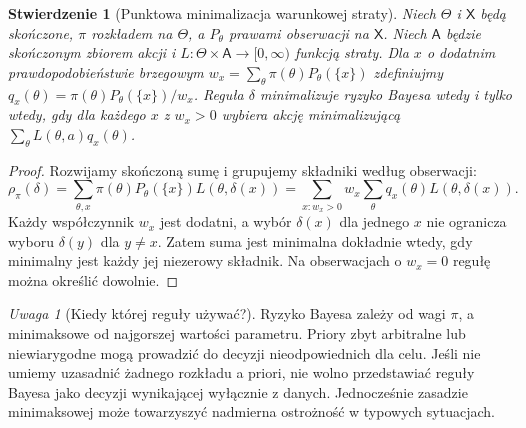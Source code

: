 \documentclass[11pt,a4paper,oneside]{report}
\numberwithin{equation}{chapter}
\theoremstyle{plain}
\newtheorem{stwierdzenie}[twierdzenie]{Stwierdzenie}
\theoremstyle{definition}
\theoremstyle{remark}
\newtheorem{uwaga}{Uwaga}[chapter]
\begin{document}
\begin{stwierdzenie}[Punktowa minimalizacja warunkowej straty]
\label{prop:conditional-decision}
Niech $\Theta$ i $\mathsf X$ będą skończone, $\pi$ rozkładem na
$\Theta$, a $P_\theta$ prawami obserwacji na $\mathsf X$.
Niech $\mathsf A$ będzie skończonym zbiorem akcji i
$L:\Theta\times\mathsf A\to[0,\infty)$ funkcją straty.
Dla $x$ o dodatnim prawdopodobieństwie brzegowym
$w_x=\sum_{\theta}\pi(\theta)P_\theta(\{x\})$ zdefiniujmy
$q_x(\theta)=\pi(\theta)P_\theta(\{x\})/w_x$.
Reguła $\delta$ minimalizuje ryzyko Bayesa wtedy i tylko wtedy,
gdy dla każdego $x$ z $w_x>0$ wybiera akcję minimalizującą
$\sum_{\theta}L(\theta,a)q_x(\theta)$.
\end{stwierdzenie}
\begin{proof}
Rozwijamy skończoną sumę i grupujemy składniki według obserwacji:
\[
\rho_\pi(\delta)
=\sum_{\theta,x}\pi(\theta)P_\theta(\{x\})L(\theta,\delta(x))
=\sum_{x:w_x>0}w_x\sum_{\theta}q_x(\theta)L(\theta,\delta(x)).
\]
Każdy współczynnik $w_x$ jest dodatni, a wybór $\delta(x)$ dla
jednego $x$ nie ogranicza wyboru $\delta(y)$ dla $y\ne x$.
Zatem suma jest minimalna dokładnie wtedy, gdy minimalny jest każdy
jej niezerowy składnik. Na obserwacjach o $w_x=0$ regułę
można określić dowolnie.
\end{proof}

\begin{uwaga}[Kiedy której reguły używać?]
Ryzyko Bayesa zależy od wagi $\pi$, a minimaksowe od najgorszej
wartości parametru. Priory zbyt arbitralne lub niewiarygodne mogą
prowadzić do decyzji nieodpowiednich dla celu. Jeśli nie umiemy
uzasadnić żadnego rozkładu a priori, nie wolno przedstawiać
reguły Bayesa jako decyzji wynikającej wyłącznie z danych.
Jednocześnie zasadzie minimaksowej może towarzyszyć nadmierna
ostrożność w typowych sytuacjach.
\end{uwaga}
\end{document}
